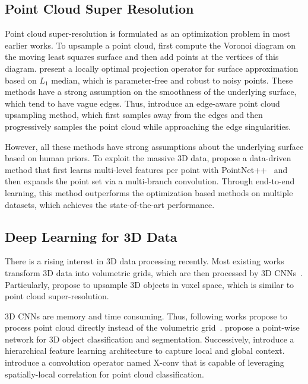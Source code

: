 \documentclass[10pt,twocolumn,letterpaper]{article}
\begin{document}
\subsection{Point Cloud Super Resolution}
Point cloud super-resolution is formulated as an optimization problem in most earlier works.
To upsample a point cloud, \cite{alexa2003computing} first compute the Voronoi diagram on the moving least squares surface and then add points at the vertices of this diagram.
\cite{lipman2007parameterization} present a locally optimal projection operator for surface approximation based on $L_1$ median, which is parameter-free and robust to noisy points.
These methods have a strong assumption on the smoothness of the underlying surface, which tend to have vague edges.
Thus, \cite{huang2013edge} introduce an edge-aware point cloud upsampling method, which first samples away from the edges and then progressively samples the point cloud while approaching the edge singularities.

However, all these methods have strong assumptions about the underlying surface based on human priors.
To exploit the massive 3D data, \cite{yu2018pu} propose a data-driven method that first learns multi-level features per point with PointNet++~\cite{qi2017pointnet++} and then expands the point set via a multi-branch convolution.
Through end-to-end learning, this method outperforms the optimization based methods on multiple datasets, which achieves the state-of-the-art performance.

\subsection{Deep Learning for 3D Data}
There is a rising interest in 3D data processing recently.
Most existing works transform 3D data into volumetric grids, which are then processed by 3D CNNs~\cite{smith20183d,maturana2015voxnet,wu20153d,riegler2017octnet}.
Particularly, \cite{smith20183d} propose to upsample 3D objects in voxel space, which is similar to point cloud super-resolution.

3D CNNs are memory and time consuming.
Thus, following works propose to process point cloud directly instead of the volumetric grid~\cite{qi2016pointnet,qi2017pointnet++,li2018pointcnn,su2018splatnet,li2018so,jiang2018pointsift}.
\cite{qi2016pointnet} propose a point-wise network for 3D object classification and segmentation.
Successively, \cite{qi2017pointnet++} introduce a hierarchical feature learning architecture to capture local and global context.
\cite{li2018pointcnn} introduce a convolution operator named X-conv that is capable of leveraging spatially-local correlation for point cloud  classification.
\end{document}
